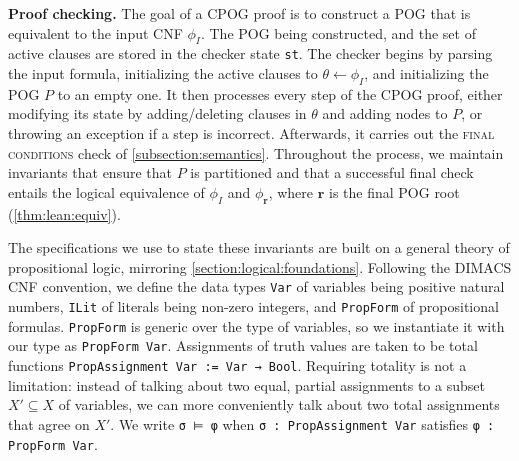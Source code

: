 \documentclass[letterpaper,USenglish,cleveref, autoref, thm-restate]{lipics-v2021}
\newcommand{\inputformula}{\phi_I}
\newcommand{\makenode}[1]{\mathbf{#1}}
\newcommand{\noder}{\makenode{r}}
\begin{document}
\vspace{1em}\noindent
\textbf{Proof checking.} The goal of a CPOG proof is to construct a POG that is equivalent to the input CNF $\inputformula$. The POG being constructed, and the set of active clauses are stored in the checker state \texttt{st}. The checker begins by parsing the input formula, initializing the active clauses to $\theta \leftarrow \inputformula$, and initializing the POG $P$ to an empty one. It then processes every step of the CPOG proof, either modifying its state by adding/deleting clauses in $\theta$ and adding nodes to $P$, or throwing an exception if a step is incorrect. Afterwards, it carries out the \textsc{final conditions} check of \cref{subsection:semantics}. Throughout the process, we maintain invariants that ensure that $P$ is partitioned and that a successful final check entails the logical equivalence of $\inputformula$ and $\phi_\noder$, where $\noder$ is the final POG root (\cref{thm:lean:equiv}).

The specifications we use to state these invariants are built on a general theory of propositional logic, mirroring \cref{section:logical:foundations}. Following the DIMACS CNF convention, we define the data types \lstinline{Var} of variables being positive natural numbers, \lstinline{ILit} of literals being non-zero integers, and \lstinline{PropForm} of propositional formulas. \lstinline{PropForm} is generic over the type of variables, so we instantiate it with our type as \lstinline{PropForm Var}. Assignments of truth values are taken to be total functions \lstinline{PropAssignment Var := Var → Bool}. Requiring totality is not a limitation: instead of talking about two equal, partial assignments to a subset $X' \subseteq X$ of variables, we can more conveniently talk about two total assignments that agree on $X'$. We write \lstinline{σ ⊨ φ} when \lstinline{σ : PropAssignment Var} satisfies \lstinline{φ : PropForm Var}.
\end{document}
